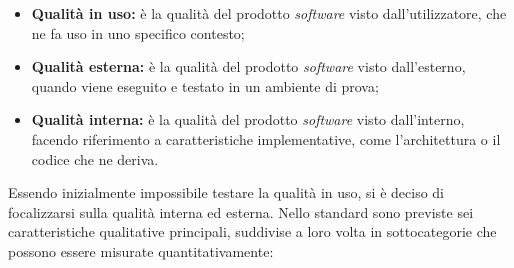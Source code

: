\begin{itemize}
	\item \textbf{Qualità in uso:} è la qualità del prodotto \textit{software} 
	visto dall'utilizzatore, che ne fa uso in uno specifico contesto;
	\item \textbf{Qualità esterna:} è la qualità del prodotto 
	\textit{software} visto dall'esterno, quando viene eseguito e testato in un 
	ambiente di prova;
	\item \textbf{Qualità interna:} è la qualità del prodotto 
	\textit{software} visto dall'interno, facendo riferimento a 
	caratteristiche implementative, come l'architettura o il codice che ne 
	deriva.
\end{itemize}
Essendo inizialmente impossibile testare la qualità in uso, si è deciso di 
focalizzarsi sulla qualità interna ed esterna. Nello standard sono previste sei 
caratteristiche qualitative principali, suddivise a loro volta in 
sottocategorie che possono essere misurate quantitativamente:

